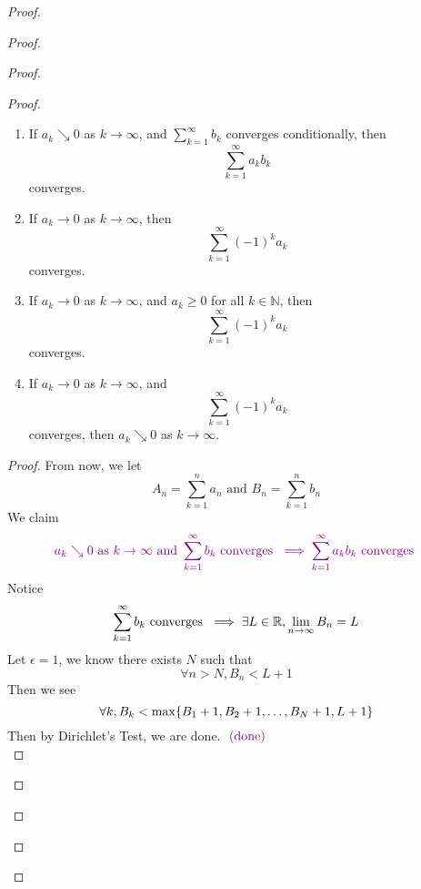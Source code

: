 \documentclass{report}
\begin{document}
\begin{proof}
\begin{proof}
\begin{proof}
\begin{proof}
\begin{question}{}{}
\begin{enumerate}
    \item If \( a_k \searrow 0 \) as \( k \to \infty \), and  $\sum_{k=1}^{\infty} b_k$ converges conditionally, then 
    \[
    \sum_{k=1}^{\infty} a_kb_k
    \]
    converges.
    
    \item If \( a_k \to 0 \) as \( k \to \infty \), then 
    \[
    \sum_{k=1}^{\infty} (-1)^k a_k
    \]
    converges.
    
    \item If \( a_k \to 0 \) as \( k \to \infty \), and \( a_k \geq 0 \) for all \( k \in \mathbb{N} \), then 
    \[
    \sum_{k=1}^{\infty} (-1)^k a_k
    \]
    converges.
    
    \item If \( a_k \to 0 \) as \( k \to \infty \), and 
    \[
    \sum_{k=1}^{\infty} (-1)^k a_k
    \]
    converges, then \( a_k \searrow 0 \) as \( k \to \infty \).
\end{enumerate}
\end{question}
\begin{proof}
From now, we let 
\begin{equation}
A_n=\sum_{k=1}^n a_n\text{ and }B_n=\sum_{k=1}^n b_n
\end{equation}
We claim
\begin{equation}
  \textcolor{violet}{a_k\searrow 0\text{ as $k\to \infty$ and }\sum_{k=1}^\infty b_k\text{ converges }\implies \sum_{k=1}^\infty a_kb_k\text{ converges }}
\end{equation}
Notice 
\begin{equation}
\sum_{k=1}^\infty b_k\text{ converges }\implies \exists L\in\mathbb{R}, \lim_{n\to\infty}B_n=L
\end{equation}
Let $\epsilon =1$, we know there exists $N$ such that  
\begin{equation}
\forall n>N, B_n<L+1
\end{equation}
Then we see 
\begin{equation}
\forall k, B_k<\max \{ B_1+1,B_2+1,\dots ,B_{N}+1,L+1 \}
\end{equation}
Then by Dirichlet's Test, we are done. $\textcolor{violet}{\text{ (done) }}$\\


\end{proof}
\end{proof}
\end{proof}
\end{proof}
\end{proof}
\end{document}
